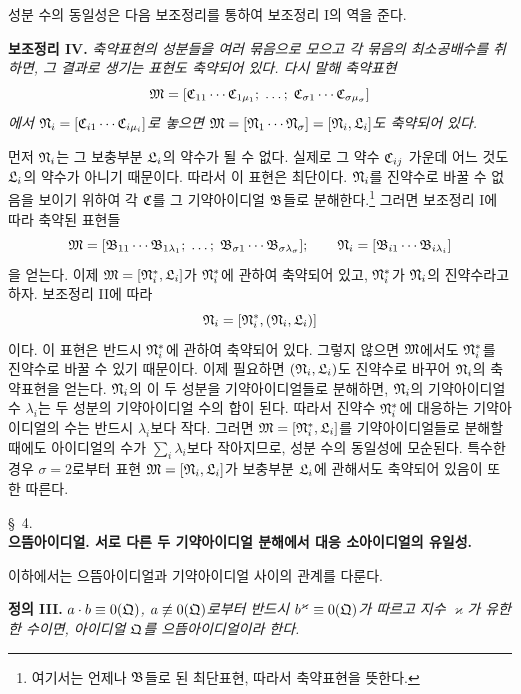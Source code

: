 성분 수의 동일성은 다음 보조정리를 통하여 보조정리 I의 역을 준다.

\textbf{보조정리 IV.} \emph{축약표현의 성분들을 여러 묶음으로 모으고 각 묶음의 최소공배수를 취하면, 그 결과로 생기는 표현도 축약되어 있다. 다시 말해 축약표현}
\[
 \mathfrak{M}=[\mathfrak{C}_{11}\cdots\mathfrak{C}_{1\mu_1};\;\ldots;\;
 \mathfrak{C}_{\sigma1}\cdots\mathfrak{C}_{\sigma\mu_\sigma}]
\]
\emph{에서 $\mathfrak{N}_i=[\mathfrak{C}_{i1}\cdots\mathfrak{C}_{i\mu_i}]$로 놓으면 $\mathfrak{M}=[\mathfrak{N}_1\cdots\mathfrak{N}_\sigma]=[\mathfrak{N}_i,\mathfrak{L}_i]$도 축약되어 있다.}

먼저 $\mathfrak{N}_i$는 그 보충부분 $\mathfrak{L}_i$의 약수가 될 수 없다. 실제로 그 약수 $\mathfrak{C}_{ij}$ 가운데 어느 것도 $\mathfrak{L}_i$의 약수가 아니기 때문이다. 따라서 이 표현은 최단이다. $\mathfrak{N}_i$를 진약수로 바꿀 수 없음을 보이기 위하여 각 $\mathfrak{C}$를 그 기약아이디얼 $\mathfrak{B}$들로 분해한다.\footnote{여기서는 언제나 $\mathfrak{B}$들로 된 최단표현, 따라서 축약표현을 뜻한다.} 그러면 보조정리 I에 따라 축약된 표현들
\[
 \mathfrak{M}=[\mathfrak{B}_{11}\cdots\mathfrak{B}_{1\lambda_1};\;\ldots;\;
 \mathfrak{B}_{\sigma1}\cdots\mathfrak{B}_{\sigma\lambda_\sigma}];
 \qquad
 \mathfrak{N}_i=[\mathfrak{B}_{i1}\cdots\mathfrak{B}_{i\lambda_i}]
\]
을 얻는다. 이제 $\mathfrak{M}=[\mathfrak{N}_i^*,\mathfrak{L}_i]$가 $\mathfrak{N}_i^*$에 관하여 축약되어 있고, $\mathfrak{N}_i^*$가 $\mathfrak{N}_i$의 진약수라고 하자. 보조정리 II에 따라
\[
 \mathfrak{N}_i=[\mathfrak{N}_i^*,(\mathfrak{N}_i,\mathfrak{L}_i)]
\]
이다. 이 표현은 반드시 $\mathfrak{N}_i^*$에 관하여 축약되어 있다. 그렇지 않으면 $\mathfrak{M}$에서도 $\mathfrak{N}_i^*$를 진약수로 바꿀 수 있기 때문이다. 이제 필요하면 $(\mathfrak{N}_i,\mathfrak{L}_i)$도 진약수로 바꾸어 $\mathfrak{N}_i$의 축약표현을 얻는다. $\mathfrak{N}_i$의 이 두 성분을 기약아이디얼들로 분해하면, $\mathfrak{N}_i$의 기약아이디얼 수 $\lambda_i$는 두 성분의 기약아이디얼 수의 합이 된다. 따라서 진약수 $\mathfrak{N}_i^*$에 대응하는 기약아이디얼의 수는 반드시 $\lambda_i$보다 작다. 그러면 $\mathfrak{M}=[\mathfrak{N}_i^*,\mathfrak{L}_i]$를 기약아이디얼들로 분해할 때에도 아이디얼의 수가 $\sum_i\lambda_i$보다 작아지므로, 성분 수의 동일성에 모순된다. 특수한 경우 $\sigma=2$로부터 표현 $\mathfrak{M}=[\mathfrak{N}_i,\mathfrak{L}_i]$가 보충부분 $\mathfrak{L}_i$에 관해서도 축약되어 있음이 또한 따른다.

\begin{center}
\S~4.\\[0.25em]
\textbf{으뜸아이디얼. 서로 다른 두 기약아이디얼 분해에서 대응 소아이디얼의 유일성.}
\end{center}

이하에서는 으뜸아이디얼과 기약아이디얼 사이의 관계를 다룬다.

\textbf{정의 III.} \emph{$a\cdot b\equiv0(\mathfrak{Q})$, $a\not\equiv0(\mathfrak{Q})$로부터 반드시 $b^\varkappa\equiv0(\mathfrak{Q})$가 따르고 지수 $\varkappa$가 유한한 수이면, 아이디얼 $\mathfrak{Q}$를 으뜸아이디얼이라 한다.}

